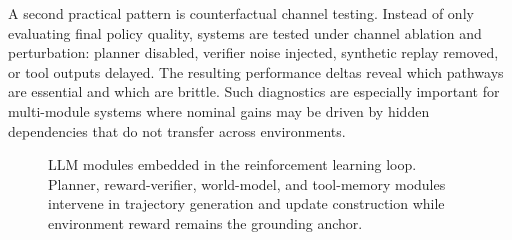 \documentclass[pdflatex,sn-mathphys-num]{sn-jnl}
\begin{document}
A second practical pattern is counterfactual channel testing. Instead of only evaluating final policy quality, systems are tested under channel ablation and perturbation: planner disabled, verifier noise injected, synthetic replay removed, or tool outputs delayed. The resulting performance deltas reveal which pathways are essential and which are brittle. Such diagnostics are especially important for multi-module systems where nominal gains may be driven by hidden dependencies that do not transfer across environments.

\begin{figure}[t]
\centering
\resizebox{0.95\textwidth}{!}{}
\caption{LLM modules embedded in the reinforcement learning loop. Planner, reward-verifier, world-model, and tool-memory modules intervene in trajectory generation and update construction while environment reward remains the grounding anchor.}
\label{fig:loop}
\end{figure}
\end{document}
